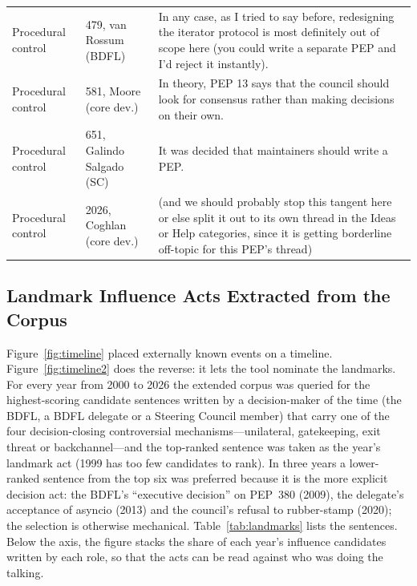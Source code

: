 \documentclass[sigconf,screen]{acmart}
\begin{document}
\begin{table}[t]
\begin{tabular}{p{}p{}p{}}
Procedural control & 479, van Rossum (BDFL) & In any case, as I tried to say before, redesigning the iterator protocol is most definitely out of scope here (you could write a separate PEP and I'd reject it instantly). \\
Procedural control & 581, Moore (core dev.) & In theory, PEP 13 says that the council should look for consensus rather than making decisions on their own. \\
Procedural control & 651, Galindo Salgado (SC) & It was decided that maintainers should write a PEP. \\
Procedural control & 2026, Coghlan (core dev.) & (and we should probably stop this tangent here or else split it out to its own thread in the Ideas or Help categories, since it is getting borderline off-topic for this PEP's thread) \\
\bottomrule
\end{tabular}
\end{table}

\subsection{Landmark Influence Acts Extracted from the Corpus}
\label{sec:landmarks}

Figure~\ref{fig:timeline} placed externally known events on a timeline. Figure~\ref{fig:timeline2} does the reverse: it lets the tool nominate the landmarks. For every year from 2000 to 2026 the extended corpus was queried for the highest-scoring candidate sentences written by a decision-maker of the time (the BDFL, a BDFL delegate or a Steering Council member) that carry one of the four decision-closing controversial mechanisms---unilateral, gatekeeping, exit threat or backchannel---and the top-ranked sentence was taken as the year's landmark act (1999 has too few candidates to rank). In three years a lower-ranked sentence from the top six was preferred because it is the more explicit decision act: the BDFL's ``executive decision'' on PEP~380 (2009), the delegate's acceptance of asyncio (2013) and the council's refusal to rubber-stamp (2020); the selection is otherwise mechanical. Table~\ref{tab:landmarks} lists the sentences. Below the axis, the figure stacks the share of each year's influence candidates written by each role, so that the acts can be read against who was doing the talking.
\end{document}

